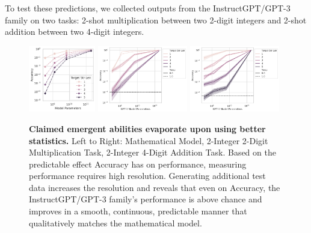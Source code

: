 To test these predictions, we collected outputs from the InstructGPT/GPT-3 family on two tasks: 2-shot multiplication between two 2-digit integers and 2-shot addition between two 4-digit integers.

\begin{figure}
    \centering
    \includegraphics[width=0.26\textwidth]{figures/toy_emergence/acc_log_many_vs_model_size_by_target_str_len.pdf}%
    \includegraphics[width=0.35\textwidth]{figures/gpt3_integer_multiplication/multiplication_acc_log_vs_model_size_by_temp_by_target_str_len.png}%
    \includegraphics[width=0.35\textwidth]{figures/gpt3_integer_addition/addition_acc_log_vs_model_size_by_temp_by_target_str_len.png}
    \caption{\textbf{Claimed emergent abilities evaporate upon using better statistics.} Left to Right: Mathematical Model, 2-Integer 2-Digit Multiplication Task, 2-Integer 4-Digit Addition Task. Based on the predictable effect Accuracy has on performance, measuring performance requires high resolution. Generating additional test data increases the resolution and reveals that even on Accuracy, the InstructGPT/GPT-3 family's \cite{brown2020language, lowe2022instruct} performance is above chance and improves in a smooth, continuous, predictable manner that qualitatively matches the mathematical model.}
    \label{fig:gpt_improve_resolution}
\end{figure}

